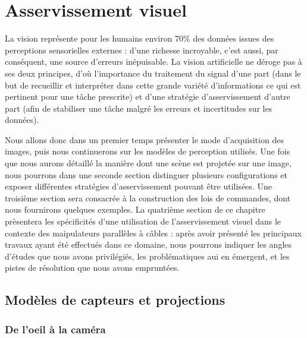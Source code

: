 \chapter{Asservissement visuel} \label{chap1}

La vision représente pour les humains environ 70\% des données issues des 
perceptions sensorielles externes \cite{purves2004neuroscience} : d'une 
richesse incroyable, c'est aussi, par conséquent, une source d'erreurs 
inépuisable. La vision artificielle ne déroge pas à ses deux principes, d'où 
l'importance du traitement du signal d'une part (dans le but de recueillir et 
interpréter dans cette grande variété d'informations ce qui est pertinent pour 
une tâche prescrite) et d'une stratégie d'asservissement d'autre part (afin de 
stabiliser une tâche malgré les erreurs et incertitudes sur les données).

Nous allons donc dans un premier temps présenter le mode d'acquisition des 
images, puis nous continuerons sur les modèles de perception utilisés. Une fois 
que nous aurons détaillé la manière dont une scène est projetée sur une image, 
nous pourrons dans une seconde section distinguer plusieurs configurations et 
exposer différentes stratégies d'asservissement pouvant être utilisées. Une 
troisi\`eme section sera consacr\'ee \`a la construction des lois de 
commandes, dont nous fournirons quelques exemples. La quatri\`eme section de ce 
chapitre pr\`esentera les sp\'ecificit\'es d'une utilisation de 
l'asservissement visuel dans le contexte des maipulateurs parall\`eles \`a 
c\^ables : apr\`es avoir pr\'esent\'e les principaux travaux ayant \'et\'e 
effectu\'es dans ce domaine, nous pourrons indiquer les angles d'\'etudes que 
nous avons privil\'egi\'es, les probl\'ematiques aui en \'emergent, et les 
pistes de r\'esolution que nous avons emprunt\'ees.
 
\section{Modèles de capteurs et projections} \label{chap1-0}
 
\subsection{De l'oeil à la caméra} \label{chap1-0-0}
 
